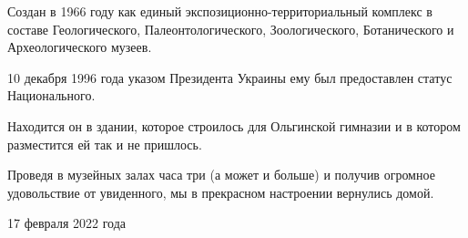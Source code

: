 Создан в 1966 году как единый экспозиционно-территориальный комплекс в составе
Геологического, Палеонтологического, Зоологического, Ботанического и
Археологического музеев.

10 декабря 1996 года указом Президента Украины ему  был предоставлен статус
Национального.

Находится он в здании, которое строилось для Ольгинской гимназии и в котором
разместится  ей так и не пришлось.   

Проведя в музейных залах часа три (а может и больше) и получив огромное
удовольствие от увиденного, мы в прекрасном настроении вернулись домой.

17 февраля 2022 года
